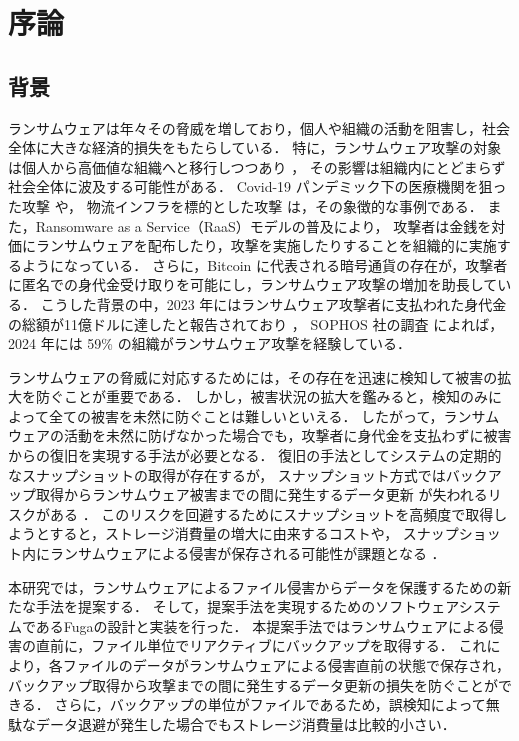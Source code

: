 \chapter{序論}
\section{背景}
ランサムウェアは年々その脅威を増しており，個人や組織の活動を阻害し，社会全体に大きな経済的損失をもたらしている．
特に，ランサムウェア攻撃の対象は個人から高価値な組織へと移行しつつあり \cite{sophos-report:online,early-detection}，
その影響は組織内にとどまらず社会全体に波及する可能性がある．
Covid-19 パンデミック下の医療機関を狙った攻撃 \cite{Covid19R19:online} や，
物流インフラを標的とした攻撃 \cite{nagoya-port-attack} は，その象徴的な事例である．
また，Ransomware as a Service（RaaS）モデルの普及により，
攻撃者は金銭を対価にランサムウェアを配布したり，攻撃を実施したりすることを組織的に実施するようになっている．
さらに，Bitcoin に代表される暗号通貨の存在が，攻撃者に匿名での身代金受け取りを可能にし，ランサムウェア攻撃の増加を助長している．
こうした背景の中，2023 年にはランサムウェア攻撃者に支払われた身代金の総額が11億ドルに達したと報告されており \cite{Ransomwa86:online}，
SOPHOS 社の調査 \cite{sophos-report:online} によれば，2024 年には 59\% の組織がランサムウェア攻撃を経験している．

ランサムウェアの脅威に対応するためには，その存在を迅速に検知して被害の拡大を防ぐことが重要である．
しかし，被害状況の拡大を鑑みると，検知のみによって全ての被害を未然に防ぐことは難しいといえる．
したがって，ランサムウェアの活動を未然に防げなかった場合でも，攻撃者に身代金を支払わずに被害からの復旧を実現する手法が必要となる．
復旧の手法としてシステムの定期的なスナップショットの取得が存在するが，
スナップショット方式ではバックアップ取得からランサムウェア被害までの間に発生するデータ更新
が失われるリスクがある \cite{wang2024ransom}．
このリスクを回避するためにスナップショットを高頻度で取得しようとすると，ストレージ消費量の増大に由来するコストや，
スナップショット内にランサムウェアによる侵害が保存される可能性が課題となる
\cite{wang2024ransom, veena2021incremental}．

本研究では，ランサムウェアによるファイル侵害からデータを保護するための新たな手法を提案する．
そして，提案手法を実現するためのソフトウェアシステムであるFugaの設計と実装を行った．
本提案手法ではランサムウェアによる侵害の直前に，ファイル単位でリアクティブにバックアップを取得する．
これにより，各ファイルのデータがランサムウェアによる侵害直前の状態で保存され，
バックアップ取得から攻撃までの間に発生するデータ更新の損失を防ぐことができる．
さらに，バックアップの単位がファイルであるため，誤検知によって無駄なデータ退避が発生した場合でもストレージ消費量は比較的小さい．

